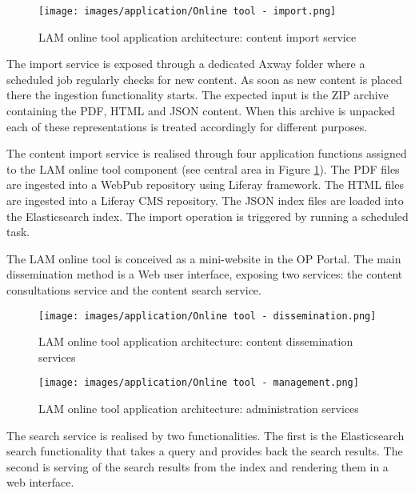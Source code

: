     \begin{figure}[!h]
		\centering
		\texttt{[image: images/application/Online tool - import.png]}
		\caption{LAM online tool application architecture: content import service}
		\label{fig:app-online-tool-ingestion}
	\end{figure}	

	The import service is exposed through a dedicated Axway folder where a scheduled job regularly checks for new content. As soon as new content is placed there the ingestion functionality starts. The expected input is the ZIP archive containing the PDF, HTML and JSON content. When this archive is unpacked each of these representations is treated accordingly for different purposes.
	
	The content import service is realised through four application functions assigned to the LAM online tool component (see central area in Figure \ref{fig:app-online-tool-ingestion}). The PDF files are ingested into a WebPub repository using Liferay framework. The HTML files are ingested into a Liferay CMS repository. The JSON index files are loaded into the Elasticsearch index. The import operation is triggered by running a scheduled task.
	
	The LAM online tool is conceived as a mini-website in the OP Portal. The main dissemination method is a Web user interface, exposing two services: the content consultations service and the content search service. 
	
    \begin{figure}[!h]
	\centering
	\texttt{[image: images/application/Online tool - dissemination.png]}
	\caption{LAM online tool application architecture: content dissemination services}
	\label{fig:app-online-tool-dissemination}
	\end{figure}
		

    \begin{figure}[!h]
	\centering
	\texttt{[image: images/application/Online tool - management.png]}
	\caption{LAM online tool application architecture: administration services}
	\label{fig:app-online-tool-management}
	\end{figure}

	The search service is realised by two functionalities. The first is the Elasticsearch search functionality that takes a query and provides back the search results. The second is serving of the search results from the index and rendering them in a web interface. 
	
